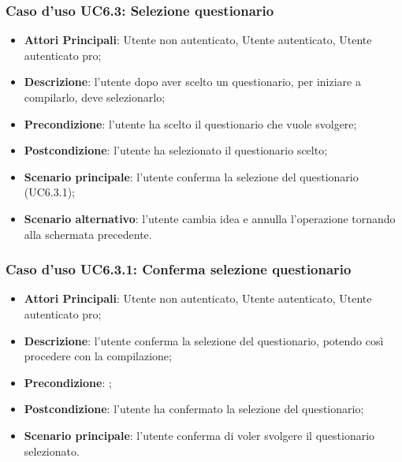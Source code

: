 \subsubsection{Caso d'uso UC6.3: Selezione questionario}
\begin{itemize}
\item\textbf{Attori Principali}: Utente non autenticato, Utente autenticato, Utente autenticato pro;
\item\textbf{Descrizione}: l'utente dopo aver scelto un questionario, per iniziare a compilarlo, deve selezionarlo;
\item\textbf{Precondizione}: l'utente ha scelto il questionario che vuole svolgere;
\item\textbf{Postcondizione}: l'utente ha selezionato il questionario scelto;
\item\textbf{Scenario principale}: l'utente conferma la selezione del questionario (UC6.3.1);
\item\textbf{Scenario alternativo}: l'utente cambia idea e annulla l'operazione tornando alla schermata precedente.
\end{itemize}

\subsubsection{Caso d'uso UC6.3.1: Conferma selezione questionario}
\begin{itemize}
\item\textbf{Attori Principali}: Utente non autenticato, Utente autenticato, Utente autenticato pro;
\item\textbf{Descrizione}: l'utente conferma la selezione del questionario, potendo così procedere con la compilazione;
\item\textbf{Precondizione}: ;
\item\textbf{Postcondizione}: l'utente ha confermato la selezione del questionario;
\item\textbf{Scenario principale}: l'utente conferma di voler svolgere il questionario selezionato.
\end{itemize}

